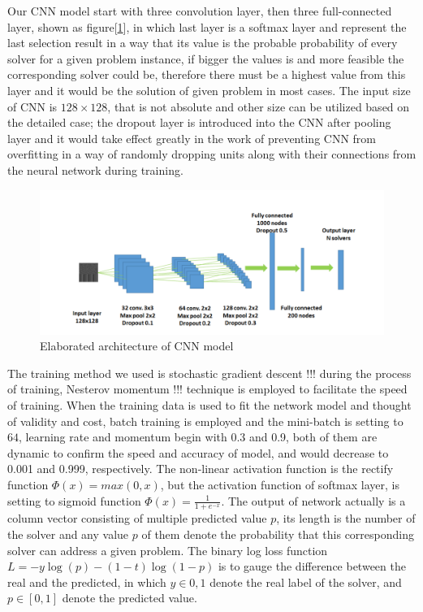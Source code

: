 \documentclass{article}
\begin{document}
    Our CNN model start with three convolution layer, then three full-connected layer, shown as figure[\ref{fig:CNN architecture}], in which last layer is a softmax layer and represent the last selection result in a way that its value is the probable probability of every solver for a given problem instance, if bigger the values is and more feasible the corresponding solver could be, therefore there must be a highest value from this layer and it would be the solution of given problem in most cases. The input size of CNN is $128\times 128$, that is not absolute and other size can be utilized based on the detailed case; the dropout\cite{krizhevsky2012imagenet} layer is introduced into the CNN after pooling layer and it would take effect greatly in the work of preventing CNN from overfitting in a way of randomly dropping units along with their connections from the neural network during training.
    
    \begin{figure}[htbp!]
        \centering
        \includegraphics[scale=0.3]{./assets/cnn-ap.png}
        \caption{Elaborated architecture of CNN model}
        \label{fig:CNN architecture}
    \end{figure}
    
    The training method we used is stochastic gradient descent !!!%
    during the process of training, Nesterov momentum !!!%
    technique is employed to facilitate the speed of training. When the training data is used to fit the network model and thought of validity and cost, batch training is employed and the mini-batch is setting to $64$, learning rate and momentum begin with 0.3 and 0.9, both of them are dynamic to confirm the speed and accuracy of model, and would decrease to 0.001 and 0.999, respectively. The non-linear activation function is the rectify function $\Phi(x) = max(0, x)$, but the activation function of softmax layer, is setting to sigmoid function $\Phi(x) = \frac{1}{1+e^{-x}}$. The output of network actually is a column vector consisting of multiple predicted value $p$, its length is the number of the solver and any value $p$ of them denote the probability that this corresponding solver can address a given problem. The binary log loss function $L = -y \log(p)-(1-t)\log(1-p)$ is to gauge the difference between the real and the predicted, in which $y\in {0,1}$ denote the real label of the solver, and $p \in [0,1]$ denote the predicted value.
    
\end{document}
